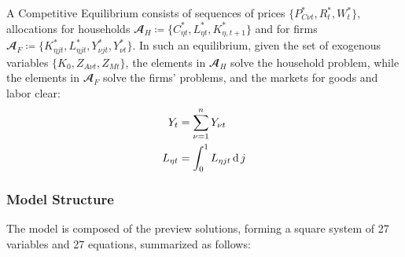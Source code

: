 \documentclass[
thesis.tex
]{subfiles}
\begin{document}
A Competitive Equilibrium consists of sequences of prices $\{P_{C\nu t}^\ast, R_t^\ast, W_t^\ast\}$, allocations for households $\mathbfscr{A}_H \coloneq \{C_{\eta t}^\ast, L_{\eta t}^\ast, K_{\eta, t+1}^\ast\}$ and for firms $\mathbfscr{A}_F \coloneq \{K_{\eta jt}^\ast, L_{\eta jt}^\ast, Y_{\nu jt}^\ast, Y_{\nu t}^\ast\}$. In such an equilibrium, given the set of exogenous variables $\{K_0, Z_{A\nu t}, Z_{Mt}\}$, the elements in $\mathbfscr{A}_H$ solve the household problem, while the elements in $\mathbfscr{A}_F$ solve the firms' problems, and the markets for goods and labor clear:
\begin{align}
	Y_t &= \sum_{\nu=1}^{n} Y_{\nu t} \label{eq:reg-market-clearing-condition} \\
	L_{\eta t} &= \int_{0}^{1} L_{\eta jt} \operatorname{d} j \label{eq:reg-market-clearing-condition-2}
\end{align}



\subsubsection*{Model Structure}

The model is composed of the preview solutions, forming a square system of 27 variables and 27 equations, summarized as follows:
\end{document}
